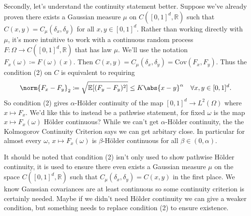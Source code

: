 \documentclass[fontsize=12pt, DIV=10]{scrreprt}
\theoremstyle{remark}
\newcommand{\defeq}{\coloneqq}
\newcommand{\R}{\mathbb R}
\newcommand{\E}{\mathbb E}
\begin{document}
Secondly, let's understand the continuity statement better. Suppose we've already proven there exists a Gaussian measure $\mu$ on $C([0, 1]^d, \R)$ such that $C(x, y) = C_{\mu}(\delta_x, \delta_y)$ for all $x, y \in [0, 1]^d$. Rather than working directly with $\mu$, it's more intuitive to work with a continuous random process $F: \Omega \to C([0, 1]^d, \R)$ that has law $\mu$. We'll use the notation $F_x(\omega) \defeq F(\omega)(x)$. Then $C(x, y) = C_{\mu}(\delta_x, \delta_y) = \text{Cov}(F_x, F_y)$. Thus the condition (2) on $C$ is equivalent to requiring
\begin{equation}
	\norm{F_x - F_y}_2 \defeq \sqrt{\E[(F_y - F_y)^2]} \leq K \abs{x - y}^{\alpha} \quad \forall x, y \in [0, 1]^d.
\end{equation}
So condition (2) gives $\alpha$-H\"older continuity of the map $[0, 1]^d \to L^2(\Omega)$ where $x \mapsto F_x$. We'd like this to instead be a pathwise statement, for fixed $\omega$ is the map $x \mapsto F_x(\omega)$ H\"older continuous? While we can't get $\alpha$-H\"older continuity, the the Kolmogorov Continuity Criterion says we can get arbitary close. In particular for almost every $\omega$, $x \mapsto F_x(\omega)$ is $\beta$-H\"older continuous for all $\beta \in (0, \alpha)$.

It should be noted that condition (2) isn't only used to show pathwise H\"older continuity, it is used to ensure there even exists a Gaussian measure $\mu$ on  the space $C([0, 1]^d, \R)$ such that $C_{\mu}(\delta_x, \delta_y) = C(x, y)$ in the first place. We know Gaussian covariances are at least continuous so some continuity criterion is certainly needed. Maybe if we didn't need H\"older continuity we can give a weaker condition, but something needs to replace condition (2) to ensure existence.
\end{document}
